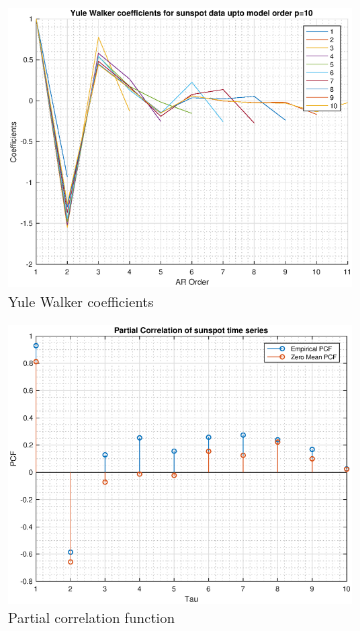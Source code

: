 \begin{figure}[h!]
\centering
\begin{subfigure}{0.32\textwidth}
\centering
\includegraphics[width = \textwidth]{yulewalker}
\caption{Yule Walker coefficients}
\label{fig:yulewalker}
\end{subfigure}
\begin{subfigure}{0.32\textwidth}
\centering
\includegraphics[width = \textwidth]{pcf}
\caption{Partial correlation function}
\label{fig:pcf}
\end{subfigure}
\label{yule_pcf}
\caption{}
\end{figure}



